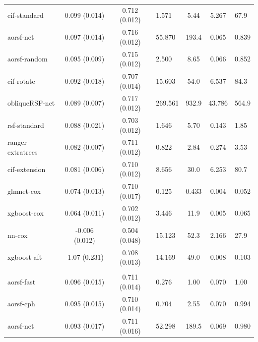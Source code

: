 \documentclass[twoside,11pt]{article}\usepackage[]{graphicx}\usepackage[]{xcolor}
\newenvironment{knitrout}{}{} %
\begin{document}
\begin{knitrout}
\begin{longtable}{lcclccl}
\hspace{1em}cif-standard & 0.099 (0.014) & 0.712 (0.012) & 1.571 & 5.44 & 5.267 & 67.9\\
\hspace{1em}aorsf-net & 0.097 (0.014) & 0.716 (0.012) & 55.870 & 193.4 & 0.065 & 0.839\\
\hspace{1em}aorsf-random & 0.095 (0.009) & 0.715 (0.012) & 2.500 & 8.65 & 0.066 & 0.852\\
\hspace{1em}cif-rotate & 0.092 (0.018) & 0.707 (0.014) & 15.603 & 54.0 & 6.537 & 84.3\\
\hspace{1em}obliqueRSF-net & 0.089 (0.007) & 0.717 (0.012) & 269.561 & 932.9 & 43.786 & 564.9\\
\hspace{1em}rsf-standard & 0.088 (0.021) & 0.703 (0.012) & 1.646 & 5.70 & 0.143 & 1.85\\
\hspace{1em}ranger-extratrees & 0.082 (0.007) & 0.711 (0.012) & 0.822 & 2.84 & 0.274 & 3.53\\
\hspace{1em}cif-extension & 0.081 (0.006) & 0.710 (0.012) & 8.656 & 30.0 & 6.253 & 80.7\\
\hspace{1em}glmnet-cox & 0.074 (0.013) & 0.710 (0.017) & 0.125 & 0.433 & 0.004 & 0.052\\
\hspace{1em}xgboost-cox & 0.064 (0.011) & 0.702 (0.012) & 3.446 & 11.9 & 0.005 & 0.065\\
\hspace{1em}nn-cox & -0.006 (0.012) & 0.504 (0.048) & 15.123 & 52.3 & 2.166 & 27.9\\
\hspace{1em}xgboost-aft & -1.07 (0.231) & 0.708 (0.013) & 14.169 & 49.0 & 0.008 & 0.103\\
\addlinespace[0.3em]
\hline
\multicolumn{7}{l}{\textit{\textbf{Colon cancer; recurrence, n = 929, p = 12}}}\\
\hline
\hspace{1em}aorsf-fast & 0.096 (0.015) & 0.711 (0.014) & 0.276 & 1.00 & 0.070 & 1.00\\
\hspace{1em}aorsf-cph & 0.095 (0.015) & 0.710 (0.014) & 0.704 & 2.55 & 0.070 & 0.994\\
\hspace{1em}aorsf-net & 0.093 (0.017) & 0.711 (0.016) & 52.298 & 189.5 & 0.069 & 0.980\\

\end{longtable}
\end{knitrout}
\end{document}
